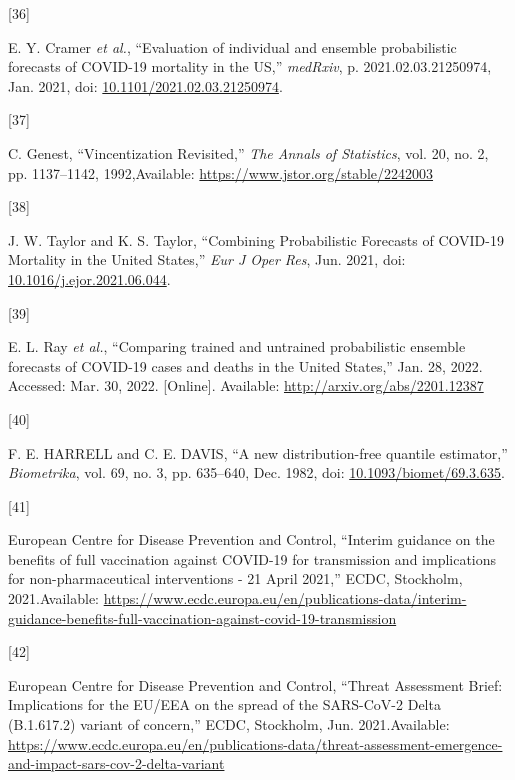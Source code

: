 \documentclass[
]{article}
\newlength{\cslhangindent}
\newlength{\csllabelwidth}
\newlength{\cslentryspacingunit} %
\newenvironment{CSLReferences}[2] %
 {%
  \setlength{\parindent}{0pt}
  \ifodd #1
  \let\oldpar\par
  \def\par{\hangindent=\cslhangindent\oldpar}
  \fi
  \setlength{\parskip}{#2\cslentryspacingunit}
 }%
 {}
\newcommand{\CSLLeftMargin}[1]{\parbox[t]{\csllabelwidth}{#1}}
\newcommand{\CSLRightInline}[1]{\parbox[t]{\linewidth - \csllabelwidth}{#1}\break}
\begin{document}
\begin{CSLReferences}{0}{0}
\leavevmode{}%
\CSLLeftMargin{{[}36{]} }
\CSLRightInline{E. Y. Cramer \emph{et al.}, {``Evaluation of individual and ensemble probabilistic forecasts of {COVID-19} mortality in the {US},''} \emph{medRxiv}, p. 2021.02.03.21250974, Jan. 2021, doi: \href{https://doi.org/10.1101/2021.02.03.21250974}{10.1101/2021.02.03.21250974}.}

\leavevmode{}%
\CSLLeftMargin{{[}37{]} }
\CSLRightInline{C. Genest, {``Vincentization {Revisited},''} \emph{The Annals of Statistics}, vol. 20, no. 2, pp. 1137--1142, 1992,Available: \url{https://www.jstor.org/stable/2242003}}

\leavevmode{}%
\CSLLeftMargin{{[}38{]} }
\CSLRightInline{J. W. Taylor and K. S. Taylor, {``Combining {Probabilistic Forecasts} of {COVID-19 Mortality} in the {United States},''} \emph{Eur J Oper Res}, Jun. 2021, doi: \href{https://doi.org/10.1016/j.ejor.2021.06.044}{10.1016/j.ejor.2021.06.044}.}

\leavevmode{}%
\CSLLeftMargin{{[}39{]} }
\CSLRightInline{E. L. Ray \emph{et al.}, {``Comparing trained and untrained probabilistic ensemble forecasts of {COVID-19} cases and deaths in the {United States},''} Jan. 28, 2022. Accessed: Mar. 30, 2022. {[}Online{]}. Available: \url{http://arxiv.org/abs/2201.12387}}

\leavevmode{}%
\CSLLeftMargin{{[}40{]} }
\CSLRightInline{F. E. HARRELL and C. E. DAVIS, {``A new distribution-free quantile estimator,''} \emph{Biometrika}, vol. 69, no. 3, pp. 635--640, Dec. 1982, doi: \href{https://doi.org/10.1093/biomet/69.3.635}{10.1093/biomet/69.3.635}.}

\leavevmode{}%
\CSLLeftMargin{{[}41{]} }
\CSLRightInline{European Centre for Disease Prevention and Control, {``Interim guidance on the benefits of full vaccination against {COVID-19} for transmission and implications for non-pharmaceutical interventions - 21 {April} 2021,''} {ECDC}, {Stockholm}, 2021.Available: \url{https://www.ecdc.europa.eu/en/publications-data/interim-guidance-benefits-full-vaccination-against-covid-19-transmission}}

\leavevmode{}%
\CSLLeftMargin{{[}42{]} }
\CSLRightInline{European Centre for Disease Prevention and Control, {``Threat {Assessment Brief}: {Implications} for the {EU}/{EEA} on the spread of the {SARS-CoV-2 Delta} ({B}.1.617.2) variant of concern,''} {ECDC}, {Stockholm}, Jun. 2021.Available: \url{https://www.ecdc.europa.eu/en/publications-data/threat-assessment-emergence-and-impact-sars-cov-2-delta-variant}}


\end{CSLReferences}
\end{document}
